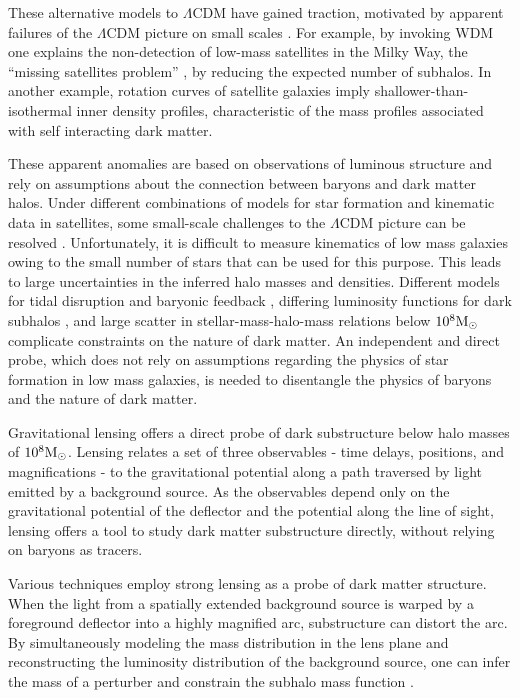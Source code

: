 These alternative models to $\Lambda$CDM have gained traction, motivated by apparent failures of the $\Lambda$CDM picture on small scales \cite{BullockBK17}. For example, by invoking WDM one explains the non-detection of low-mass satellites in the Milky Way, the ``missing satellites problem'' \cite{Klypin++99}, by reducing the expected number of subhalos. In another example, rotation curves of satellite galaxies imply shallower-than-isothermal inner density profiles, characteristic of the mass profiles associated with self interacting dark matter. 

These apparent anomalies are based on observations of luminous structure and rely on assumptions about the connection between baryons and dark matter halos. Under different combinations of models for star formation and kinematic data in satellites, some small-scale challenges to the $\Lambda$CDM picture can be resolved \cite{Kim++17}. Unfortunately, it is difficult to measure kinematics of low mass galaxies owing to the small number of stars that can be used for this purpose. This leads to large uncertainties in the inferred halo masses and densities. Different models for tidal disruption and baryonic feedback \cite{DespVeg16,GK++17}, differing luminosity functions for dark subhalos \cite{Nierenberg++16}, and large scatter in stellar-mass-halo-mass relations below $10^8 {\rm{M}_{\odot}}$ \cite{Munshi++17} complicate constraints on the nature of dark matter. An independent and direct probe, which does not rely on assumptions regarding the physics of star formation in low mass galaxies, is needed to disentangle the physics of baryons and the nature of dark matter. 

Gravitational lensing offers a direct probe of dark substructure below halo masses of $10^8 {\rm{M}_{\odot}}$. Lensing relates a set of three observables - time delays, positions, and magnifications - to the gravitational potential along a path traversed by light emitted by a background source. As the observables depend only on the gravitational potential of the deflector and the potential along the line of sight, lensing offers a tool to study dark matter substructure directly, without relying on baryons as tracers.

Various techniques employ strong lensing as a probe of dark matter structure. When the light from a spatially extended background source is warped by a foreground deflector into a highly magnified arc, substructure can distort the arc. By simultaneously modeling the mass distribution in the lens plane and reconstructing the luminosity distribution of the background source, one can infer the mass of a perturber and constrain the subhalo mass function \cite{Koopmans++05,Vegetti++09,Vegetti++12,Veg++14,Li++16,Hezaveh++16,Birrer++17a,Vegetti++18}.

